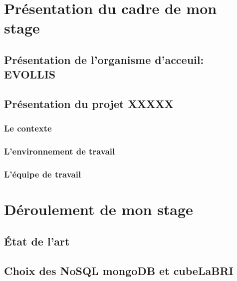 \documentclass[12pt]{report}
\begin{document}




\begin{abstract}
  
\end{abstract}

\tableofcontents





\part{Présentation du cadre de mon stage}

\chapter{Présentation de l'organisme d'acceuil: {\sf EVOLLIS}}
\chapter{Présentation du projet \sf XXXXX}
\section{Le contexte}
\section{L'environnement de travail}
\section{L'équipe de travail}

\part{Déroulement de mon stage}

\chapter{État de l'art}


\chapter{Choix des \textsf{NoSQL mongoDB} et \textsf{cubeLaBRI}}
\end{document}
